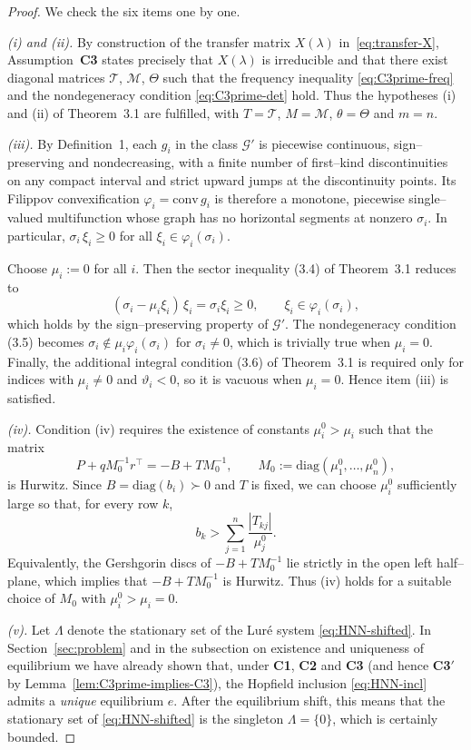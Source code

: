\documentclass[journal]{IEEEtran}
\newtheorem{proof}{Proof}
\begin{document}
\begin{proof}
We check the six items one by one.

\smallskip\noindent
\textit{(i) and (ii).}
By construction of the transfer matrix $X(\lambda)$
in~\eqref{eq:transfer-X}, Assumption~\textbf{C3} states precisely
that $X(\lambda)$ is irreducible and that there exist diagonal
matrices $\mathcal T$, $\mathcal M$, $\Theta$ such that the frequency
inequality \eqref{eq:C3prime-freq} and the nondegeneracy condition
\eqref{eq:C3prime-det} hold.  Thus the hypotheses (i) and (ii) of
Theorem~3.1 are fulfilled, with $T=\mathcal T$,
$M=\mathcal M$, $\theta=\Theta$ and $m=n$.

\smallskip\noindent
\textit{(iii).}
By Definition~1, each $g_i$ in the class $\mathcal G'$ is piecewise
continuous, sign–preserving and nondecreasing, with a finite number
of first–kind discontinuities on any compact interval and strict
upward jumps at the discontinuity points.  Its Filippov
convexification $\varphi_i=\mathrm{conv}\,g_i$ is therefore a
monotone, piecewise single–valued multifunction whose graph has no
horizontal segments at nonzero $\sigma_i$.  In particular,
$\sigma_i\,\xi_i\ge 0$ for all $\xi_i\in\varphi_i(\sigma_i)$.

Choose $\mu_i:=0$ for all $i$.  Then the sector inequality (3.4) of
Theorem~3.1 reduces to
\[
  (\sigma_i - \mu_i\xi_i)\,\xi_i
  = \sigma_i \xi_i \ge 0,
  \qquad \xi_i\in\varphi_i(\sigma_i),
\]
which holds by the sign–preserving property of $\mathcal G'$.  The
nondegeneracy condition (3.5) becomes
$\sigma_i\notin \mu_i\varphi_i(\sigma_i)$ for $\sigma_i\neq 0$, which
is trivially true when $\mu_i=0$.  Finally, the additional integral
condition (3.6) of Theorem~3.1 is required only for indices with
$\mu_i\neq0$ and $\vartheta_i<0$, so it is vacuous when
$\mu_i=0$.  Hence item (iii) is satisfied.

\smallskip\noindent
\textit{(iv).}
Condition (iv) requires the existence of constants
$\mu_i^0>\mu_i$ such that the matrix
\[
  P + qM_0^{-1}r^{\top}
  = -B + T M_0^{-1},\qquad
  M_0:=\mathrm{diag}(\mu_1^0,\dots,\mu_n^0),
\]
is Hurwitz.  Since $B=\mathrm{diag}(b_i)\succ0$ and $T$ is fixed, we
can choose $\mu_i^0$ sufficiently large so that, for every row $k$,
\[
  b_k
  > \sum_{j=1}^n \frac{|T_{kj}|}{\mu_j^0}.
\]
Equivalently, the Gershgorin discs of $-B+T M_0^{-1}$ lie strictly in
the open left half–plane, which implies that $-B+T M_0^{-1}$ is
Hurwitz.  Thus (iv) holds for a suitable choice of $M_0$ with
$\mu_i^0>\mu_i=0$.

\smallskip\noindent
\textit{(v).}
Let $\Lambda$ denote the stationary set of the Lur\'e system
\eqref{eq:HNN-shifted}.  In Section~\ref{sec:problem} and in the
subsection on existence and uniqueness of equilibrium we have already
shown that, under \textbf{C1}, \textbf{C2} and \textbf{C3}
(and hence \textbf{C3$'$} by Lemma~\ref{lem:C3prime-implies-C3}), the
Hopfield inclusion \eqref{eq:HNN-incl} admits a \emph{unique}
equilibrium $e$.  After the equilibrium shift, this means that the
stationary set of \eqref{eq:HNN-shifted} is the singleton
$\Lambda=\{0\}$, which is certainly bounded.


\end{proof}
\end{document}
